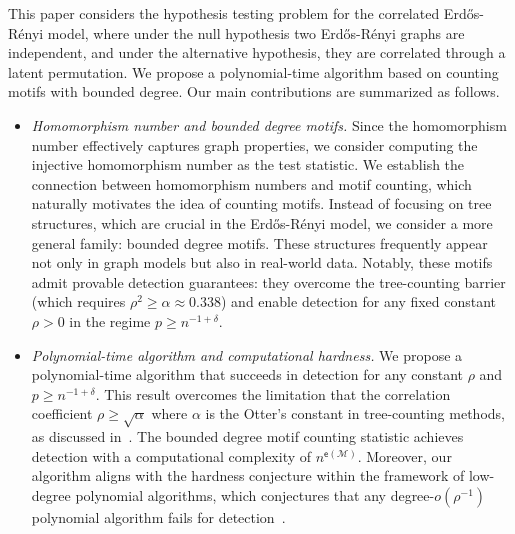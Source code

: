 \documentclass[letterpaper,11pt]{article}
\theoremstyle{definition}
\newcommand{\maM}{\mathcal{M}}
\newcommand{\en}{\mathsf{{e}}}
\newcommand{\sfe}{{\mathsf{e}}}
\newcommand{\ER}{Erd\H{o}s-R\'enyi }
\begin{document}
This paper considers the hypothesis testing problem for the correlated \ER model, where under the null hypothesis two \ER graphs are independent, and under the alternative hypothesis, they are correlated through a latent permutation. We propose a polynomial-time algorithm based on counting motifs with bounded degree. Our main contributions are summarized as follows.
\begin{itemize}
\item \emph{Homomorphism number and bounded degree motifs.}
Since the homomorphism number effectively captures graph properties, we consider computing the injective homomorphism number as the test statistic. We establish the connection between homomorphism numbers and motif counting, which naturally motivates the idea of counting motifs. Instead of focusing on tree structures, which are crucial in the \ER model, we consider a more general family: bounded degree motifs. These structures frequently appear not only in graph models but also in real-world data. Notably, these motifs admit provable detection guarantees: they overcome the tree-counting barrier (which requires $\rho^2 \ge \alpha \approx 0.338$) and enable detection for any fixed constant $\rho>0$ in the regime $p \ge n^{-1+\delta}$.
\item \emph{Polynomial-time algorithm and computational hardness.}
We propose a polynomial-time algorithm that succeeds in detection for any constant $\rho $ and $p\ge n^{-1+\delta}$. This result overcomes the limitation that the correlation coefficient $\rho \ge \sqrt{\alpha}$ where $\alpha$ is the Otter's constant in tree-counting methods, as discussed in~\cite{mao2024testing}.
The bounded degree motif counting statistic achieves detection with a computational complexity of $n^{\en(\maM)}$. Moreover, our algorithm aligns with the hardness conjecture within the framework of low-degree polynomial algorithms, which conjectures that any degree-$o(\rho^{-1})$ polynomial algorithm fails for detection~\citep{ding2023low,li2025algorithmic}.
\end{itemize}
\end{document}
